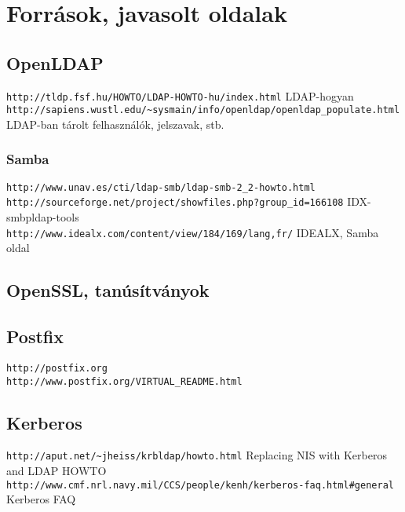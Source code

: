 \chapter{Források, javasolt oldalak}
\section*{OpenLDAP}
\verb|http://tldp.fsf.hu/HOWTO/LDAP-HOWTO-hu/index.html| LDAP-hogyan\\
\verb|http://sapiens.wustl.edu/~sysmain/info/openldap/openldap_populate.html| LDAP-ban tárolt felhasználók, jelszavak,
stb.

\subsection*{Samba}
\verb|http://www.unav.es/cti/ldap-smb/ldap-smb-2_2-howto.html|\\
\verb|http://sourceforge.net/project/showfiles.php?group_id=166108| IDX-smbpldap-tools\\
\verb|http://www.idealx.com/content/view/184/169/lang,fr/| IDEALX, Samba oldal

\section*{OpenSSL, tanúsítványok}

\section*{Postfix}

\verb|http://postfix.org|\\
\verb|http://www.postfix.org/VIRTUAL_README.html|

\section*{Kerberos}
\verb|http://aput.net/~jheiss/krbldap/howto.html| Replacing NIS with Kerberos and LDAP HOWTO\\
\verb|http://www.cmf.nrl.navy.mil/CCS/people/kenh/kerberos-faq.html#general| Kerberos FAQ

